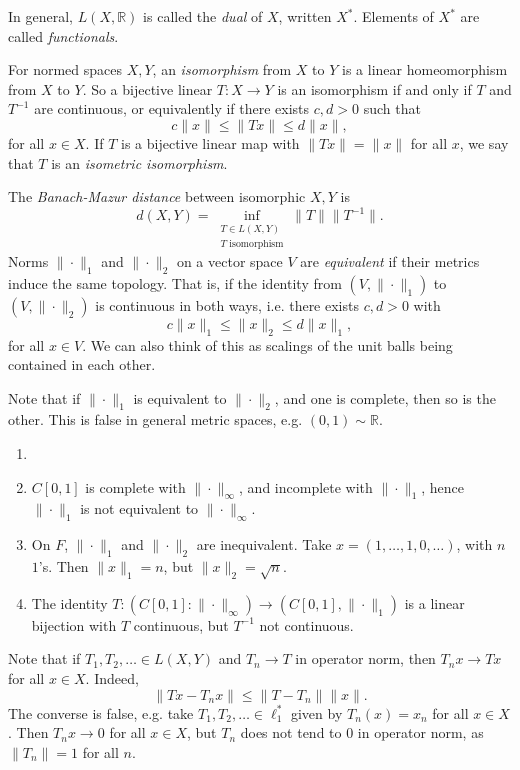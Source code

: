 \documentclass[12pt]{article}
\begin{document}
In general, $L(X, \mathbb{R})$ is called the \emph{dual} of $X$, written $X^{\ast}$. Elements of $X^{\ast}$ are called \emph{functionals}.


For normed spaces $X, Y$, an \emph{isomorphism} from $X$ to $Y$ is a linear homeomorphism from $X$ to $Y$. So a bijective linear $T : X \to Y$ is an isomorphism if and only if $T$ and $T^{-1}$ are continuous, or equivalently if there exists $c, d > 0$ such that
\[
c \|x\| \leq \|Tx\| \leq d \|x\|,
\]
for all $x \in X$. If $T$ is a bijective linear map with $\|Tx\| = \|x\|$ for all $x$, we say that $T$ is an \emph{isometric isomorphism}.

The \emph{Banach-Mazur distance} between isomorphic $X, Y$ is
\[
	d(X, Y) = \inf_{\substack{T\in L(X,Y)\\T \text{ isomorphism}}} \|T\|\|T^{-1}\|.
\]
Norms $\|\cdot\|_{1}$ and $\|\cdot\|_2$ on a vector space $V$ are \emph{equivalent} if their metrics induce the same topology. That is, if the identity from $(V,\|\cdot\|_1)$ to $(V,\|\cdot\|_2)$ is continuous in both ways, i.e. there exists $c, d > 0$ with
\[
c\|x\|_1 \leq \|x\|_2 \leq d \|x\|_1,
\]
for all $x \in V$. We can also think of this as scalings of the unit balls being contained in each other.

Note that if $\|\cdot\|_1$ is equivalent to $\|\cdot\|_2$, and one is complete, then so is the other. This is false in general metric spaces, e.g. $(0, 1) \sim \mathbb{R}$.

\begin{remark}
	\begin{enumerate}
		\item[]
		\item $C[0,1]$ is complete with $\|\cdot\|_\infty$, and incomplete with $\|\cdot\|_1$, hence $\|\cdot\|_1$ is not equivalent to $\|\cdot\|_\infty$.
		\item On $F$, $\|\cdot\|_1$ and $\|\cdot\|_2$ are inequivalent. Take $x = (1, \ldots, 1, 0, \ldots )$, with $n$ $1$'s. Then $\|x\|_1 = n$, but $\|x\|_2 = \sqrt n$.
	\item The identity $T : (C[0,1]:\|\cdot\|_\infty) \to (C[0,1], \|\cdot\|_1)$ is a linear bijection with $T$ continuous, but $T^{-1}$ not continuous.
	\end{enumerate}
\end{remark}

Note that if $T_1, T_2, \ldots \in L(X, Y)$ and $T_n \to T$ in operator norm, then $T_n x \to T x$ for all $x \in X$. Indeed,
\[
\|T x - T_n x\| \leq \|T - T_n\|\|x\|.
\]
The converse is false, e.g. take $T_1, T_2, \ldots \in \ell_1^{\ast}$ given by $T_n(x) = x_n$ for all $x \in X$. Then $T_n x \to 0$ for all $x \in X$, but $T_n$ does not tend to $0$ in operator norm, as $\|T_n\| = 1$ for all $n$.
\end{document}
